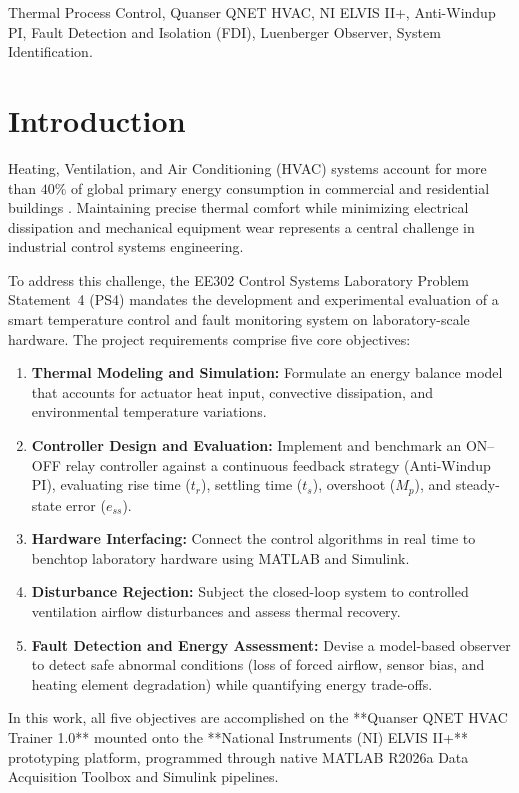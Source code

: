 \documentclass[conference]{IEEEtran}
\begin{document}
\begin{IEEEkeywords}
Thermal Process Control, Quanser QNET HVAC, NI ELVIS II+, Anti-Windup PI, Fault Detection and Isolation (FDI), Luenberger Observer, System Identification.
\end{IEEEkeywords}

\section{Introduction}
Heating, Ventilation, and Air Conditioning (HVAC) systems account for more than $40\%$ of global primary energy consumption in commercial and residential buildings \cite{astrom2006}. Maintaining precise thermal comfort while minimizing electrical dissipation and mechanical equipment wear represents a central challenge in industrial control systems engineering. 

To address this challenge, the EE302 Control Systems Laboratory Problem Statement~4 (PS4) mandates the development and experimental evaluation of a smart temperature control and fault monitoring system on laboratory-scale hardware. The project requirements comprise five core objectives:
\begin{enumerate}
    \item \textbf{Thermal Modeling and Simulation:} Formulate an energy balance model that accounts for actuator heat input, convective dissipation, and environmental temperature variations.
    \item \textbf{Controller Design and Evaluation:} Implement and benchmark an ON--OFF relay controller against a continuous feedback strategy (Anti-Windup PI), evaluating rise time ($t_r$), settling time ($t_s$), overshoot ($M_p$), and steady-state error ($e_{ss}$).
    \item \textbf{Hardware Interfacing:} Connect the control algorithms in real time to benchtop laboratory hardware using MATLAB and Simulink.
    \item \textbf{Disturbance Rejection:} Subject the closed-loop system to controlled ventilation airflow disturbances and assess thermal recovery.
    \item \textbf{Fault Detection and Energy Assessment:} Devise a model-based observer to detect safe abnormal conditions (loss of forced airflow, sensor bias, and heating element degradation) while quantifying energy trade-offs.
\end{enumerate}

In this work, all five objectives are accomplished on the **Quanser QNET HVAC Trainer 1.0** mounted onto the **National Instruments (NI) ELVIS II+** prototyping platform, programmed through native MATLAB R2026a Data Acquisition Toolbox and Simulink pipelines.
\end{document}
